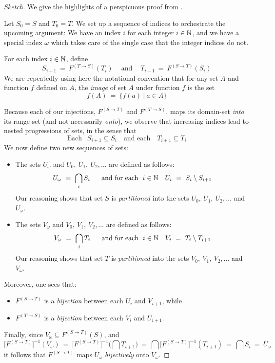 \begin{proof}[Sketch]
We give the highlights of a perspicuous proof from \cite{Tonien07}.

\smallskip

Let $S_0 = S$ and $T_0 = T$.  We set up a sequence of indices to orchestrate the upcoming argument: We have an index $i$ for each integer $i \in \mathbb{N}$, and we have a special index $\omega$ which takes care of the single case that the integer indices do not.


For each index $i \in \mathbb{N}$, define
\[ S_{i+1} \ = \ F^{(T \rightarrow S)}(T_i) \ \ \ \ \mbox{ and }
\ \ \ \ T_{i+1} \ = \ F^{(S \rightarrow T)}(S_i) 
\]
We are repeatedly using here the notational convention that for any set $A$ and function $f$ defined on $A$, the {\em image} of set $A$ under function $f$ is the set
\[ f(A) \ = \ \{ f(a) \ | \ a \in A \} \]


\medskip

Because each of our injections, $F^{(S \rightarrow T)}$ and $F^{(T \rightarrow S)}$, maps its domain-set {\em into} its range-set (and not necessarily {\em onto}), we observe that increasing indices lead to nested progressions of sets, in the sense that
\[ \mbox{Each } \ \  S_{i+1} \subseteq S_i
 \ \ \ \mbox{ and each } \ \ \ 
 T_{i+1} \subseteq T_i
\]
We now define two new sequences of sets:
\begin{itemize}
\item
The sets $U_\omega$  and $U_0, \ U_1, \ U_2, \ldots$ are defined as follows:
\[ U_\omega \ = \ \bigcap_i S_i \ \ \ \ \
\mbox{and for each } \  i \in \N \ \ \  U_i \ = \ S_i \setminus S_{i+1} \]
Our reasoning shows that set $S$ is {\em partitioned} into the sets $U_0, \ U_1, \ U_2, \ldots$ and $U_\omega$.
\medskip\item
The sets $V_\omega$  and $V_0, \ V_1, \ V_2, \ldots$ are defined as follows:
\[ V_\omega \ = \ \bigcap_i T_i \ \ \ \ \
\mbox{and for each } \  i \in \N \ \ \  V_i \ = \ T_i \setminus T_{i+1}
\]
Our reasoning shows that set $T$ is {\em partitioned} into the sets $V_0, \ V_1, \ V_2, \ldots$ and $V_\omega$.
\end{itemize}
Moreover, one sees that:
\begin{itemize}
\item
$F^{(S \rightarrow T)}$ is a {\em bijection} between each $U_i$ and $V_{i+1}$, while
\medskip\item
$F^{(T \rightarrow S)}$ is a {\em bijection} between each $V_i$ and $U_{i+1}$.
\end{itemize}
Finally, since $V_\omega \subseteq F^{(S \rightarrow T)}(S)$, and
\[ \Big[F^{(S \rightarrow T)}\Big]^{-1} (V_\omega) \ = \
\Big[F^{(S \rightarrow T)}\Big]^{-1} \Big(\bigcap T_{i+1} \Big) \ = \
\bigcap \Big[F^{(S \rightarrow T)}\Big]^{-1} (T_{i+1}) \ = \
\bigcap S_i \ = \ U_\omega
\]
it follows that $F^{(S \rightarrow T)}$ maps $U_\omega$ {\em bijectively} onto $V_\omega$.


\end{proof}
